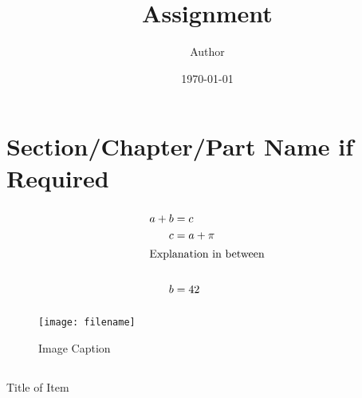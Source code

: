 \documentclass[12pt]{article}
\title{Assignment}
\author{Author}
\date{\today}
\newcommand{\exercise}{\subsection{}\setcounter{subsubsection}{0}}
\newcommand{\multipartexercise}{\addtocounter{subsection}{1}\setcounter{subsubsection}{0}}
\newcommand{\exercisepart}{\subsubsection{}}
\begin{document}
\maketitle

\section*{Section/Chapter/Part Name if Required}
\multipartexercise \exercisepart
\lipsum[1-1] %

\begin{align*}
    a + b &= c \\
    c &= a + \pi \\
    \intertext{Explanation in between} \\
    b &= 42
\end{align*}

\exercisepart
\lipsum[2-2] %

\begin{figure}[h]
    \centering
    \texttt{[image: filename]}
    \caption{Image Caption}
    \label{imagereference}
\end{figure}

\multipartexercise \exercisepart
\lipsum[3-3] %

\exercise
\begin{itemize}
    \begin{minipage}{\textwidth} %
    \item Title of Item

    \lipsum[5-5] %
    \end{minipage}
\end{itemize}
\end{document}
